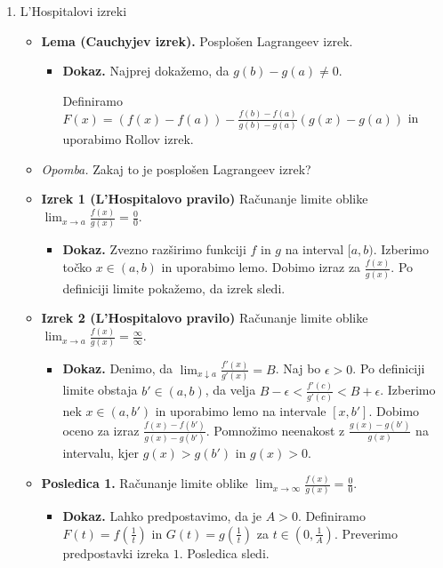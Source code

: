 \begin{enumerate}
    \item L'Hospitalovi izreki
    \begin{itemize}
        \item \colorbox{blue!30}{\textbf{Lema (Cauchyjev izrek).}} Posplošen Lagrangeev izrek. 
        \begin{itemize}
            \item \colorbox{green!30}{\textbf{Dokaz.}} Najprej dokažemo, da $g(b) - g(a) \neq 0$. 
            
            Definiramo $F(x) = (f(x) - f(a)) - \frac{f(b)-f(a)}{g(b) - g(a)}(g(x) - g(a))$ in uporabimo Rollov izrek.
        \end{itemize}
        \item \colorbox{yellow!30}{\emph{Opomba.}} Zakaj to je posplošen Lagrangeev izrek?
        \item \colorbox{blue!30}{\textbf{Izrek 1 (L'Hospitalovo pravilo)}} Računanje limite oblike $\lim_{x \to a} \frac{f(x)}{g(x)} = \frac{0}{0}$.
        \begin{itemize}
            \item \colorbox{green!30}{\textbf{Dokaz.}} Zvezno razširimo funkciji $f$ in $g$ na interval $[a, b)$. Izberimo točko $x \in (a, b)$ in uporabimo lemo. Dobimo izraz za $\frac{f(x)}{g(x)}$. Po definiciji limite pokažemo, da izrek sledi.
        \end{itemize}
        \item \colorbox{blue!30}{\textbf{Izrek 2 (L'Hospitalovo pravilo)}} Računanje limite oblike $\lim_{x \to a} \frac{f(x)}{g(x)} = \frac{\infty}{\infty}$.
        \begin{itemize}
            \item \colorbox{green!30}{\textbf{Dokaz.}} Denimo, da $\lim_{x \downarrow a} \frac{f'(x)}{g'(x)} = B$. Naj bo $\epsilon > 0$. Po definiciji limite obstaja $b' \in (a,b)$, da velja $B - \epsilon < \frac{f'(c)}{g'(c)} < B + \epsilon$. Izberimo nek $x \in (a, b')$ in uporabimo lemo na intervale $[x, b']$. Dobimo oceno za izraz $\frac{f(x) - f(b')}{g(x) - g(b')}$. Pomnožimo neenakost z $\frac{g(x) - g(b')}{g(x)}$ na intervalu, kjer $g(x) > g(b')$ in $g(x) > 0$.
        \end{itemize}
        \item \colorbox{orange!30}{\textbf{Posledica 1.}} Računanje limite oblike $\lim_{x \to \infty} \frac{f(x)}{g(x)} = \frac{0}{0}$.
        \begin{itemize}
            \item \colorbox{green!30}{\textbf{Dokaz.}} Lahko predpostavimo, da je $A>0$. Definiramo $F(t) = f(\frac{1}{t})$ in $G(t) = g(\frac{1}{t})$ za $t \in (0, \frac{1}{A})$. Preverimo predpostavki izreka $1$. Posledica sledi.

\end{itemize}
\end{itemize}
\end{enumerate}
